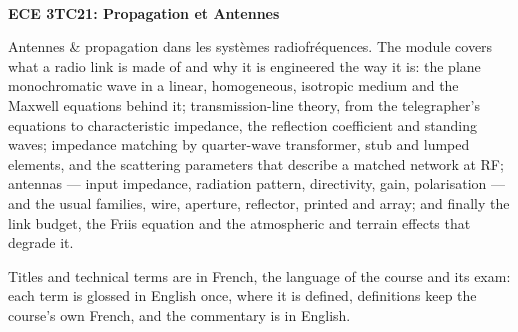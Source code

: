 \documentclass[10pt]{article}
\begin{document}
\thispagestyle{empty}
\bigskip \
\vspace{0.1cm}

\begin{center}
{\fontsize{30}{30} \selectfont \bf \sffamily ECE 3TC21: Propagation et Antennes }\\
\vspace{24pt}
\end{center}

{\parindent0pt \baselineskip=15.5pt
  Antennes \& propagation dans les systèmes radiofréquences. The module
  covers what a radio link is made of and why it is engineered the way it is:
  the plane monochromatic wave in a linear, homogeneous, isotropic medium and
  the Maxwell equations behind it; transmission-line theory, from the
  telegrapher's equations to characteristic impedance, the reflection
  coefficient and standing waves; impedance matching by quarter-wave
  transformer, stub and lumped elements, and the scattering parameters that
  describe a matched network at RF; antennas --- input impedance, radiation
  pattern, directivity, gain, polarisation --- and the usual families, wire,
  aperture, reflector, printed and array; and finally the link budget, the
  Friis equation and the atmospheric and terrain effects that degrade it.

  \medskip
  Titles and technical terms are in French, the language of the course and its exam:
  each term is glossed in English once, where it is defined, definitions keep the
  course's own French, and the commentary is in English.
}

\microtoc%
\newpage







\end{document}
